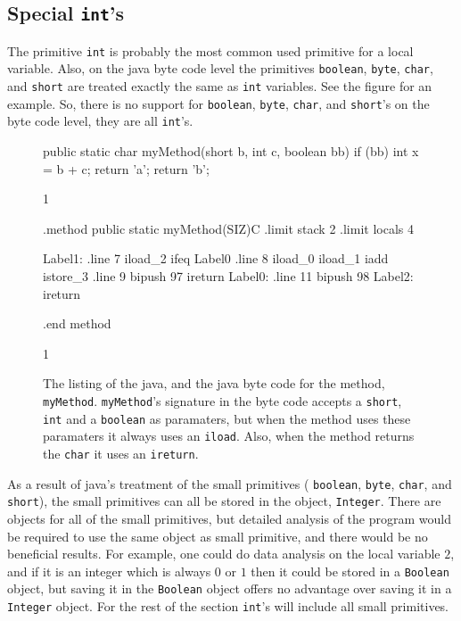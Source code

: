 \subsection{Special \texttt{int}'s}
The primitive \texttt{int} is probably the most common used
primitive for a local variable. Also, on the java byte code
level the primitives \texttt{boolean}, \texttt{byte},
\texttt{char}, and \texttt{short} are treated exactly the same as
\texttt{int} variables. See the figure for an example. So, there
is no support for \texttt{boolean}, \texttt{byte}, \texttt{char},
and \texttt{short}'s on the byte code level, they are all 
\texttt{int}'s. 

\begin{figure}[ht]
\begin{listing}{1}
   public static char myMethod(short b, int c, boolean bb) {
      if (bb) {
         int x = b + c;
         return 'a';
      }
      return 'b';
   }
\end{listing}{1}
\begin{listing}{1}
.method public static myMethod(SIZ)C
.limit stack 2
.limit locals 4

Label1:
.line 7
        iload_2
        ifeq Label0
.line 8
        iload_0
        iload_1
        iadd
        istore_3
.line 9
        bipush 97
        ireturn
Label0:
.line 11
        bipush 98
Label2:
        ireturn

.end method
\end{listing}{1}
\caption{The listing of the java, and the java byte code for the method,
  \texttt{myMethod}. \texttt{myMethod}'s signature in the byte code 
  accepts a \texttt{short}, \texttt{int} and a \texttt{boolean}
  as paramaters, but when the method uses these
  paramaters it always uses an \texttt{iload}. Also, when
  the method returns the \texttt{char} it uses an \texttt{ireturn}.}
\end{figure}

As a result of java's treatment of the small primitives (
\texttt{boolean},
\texttt{byte},
\texttt{char}, and
\texttt{short}),
the small primitives can all be stored in the object, \texttt{Integer}.
There are objects for all of the small primitives, but detailed 
analysis of the program would be required to use the same 
object as small primitive, and there would be no beneficial results.
For example, one could do data analysis on the local variable $2$, and
if it is an integer which is always $0$ or $1$ then it could be stored
in a \texttt{Boolean} object, but saving it in the  \texttt{Boolean} object
offers no advantage over saving it in a \texttt{Integer} object. For
the rest of the section \texttt{int}'s will include all small primitives.

